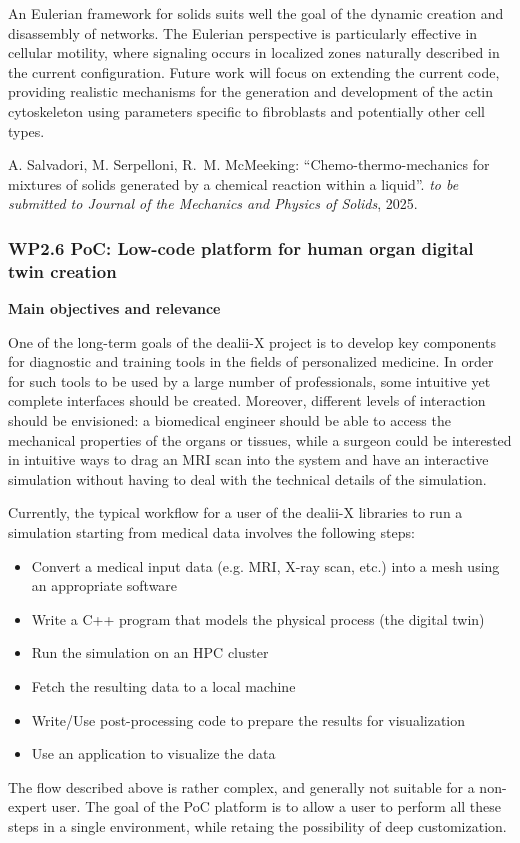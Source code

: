 \documentclass[a4paper,12pt, numbers]{article}
\begin{document}
An Eulerian framework for solids suits well the goal of the dynamic creation and disassembly of networks. The Eulerian perspective is particularly effective in cellular motility, where signaling occurs in localized zones naturally described in the current configuration. Future work will focus on extending the current code, providing realistic mechanisms for the generation and development of the actin cytoskeleton using parameters specific to fibroblasts and potentially other cell types.


\begin{thebibliography}{10}
 A. Salvadori, M. Serpelloni, R.~M. McMeeking: ``Chemo-thermo-mechanics for mixtures of solids generated by a chemical reaction within a liquid''. \emph{to be submitted to Journal of the Mechanics and Physics of
Solids}, 2025.
\end{thebibliography}

\subsubsection*{WP2.6 PoC: Low-code platform for human organ digital twin creation}

\noindent\textbf{Main objectives and relevance}

One of the long-term goals of the dealii-X project is to develop key components for diagnostic and training tools in the fields of personalized medicine. In order for such tools to be used by a large number of professionals, some intuitive yet complete interfaces should be created. Moreover, different levels of interaction should be envisioned: a biomedical engineer should be able to access the mechanical properties of the organs or tissues, while a surgeon could be interested in intuitive ways to drag an MRI scan into the system and have an interactive simulation without having to deal with the technical details of the simulation.

Currently, the typical workflow for a user of the dealii-X libraries to run a simulation starting from medical data involves the following steps:
\begin{itemize}
\item Convert a medical input data (e.g. MRI, X-ray scan, etc.) into a mesh using an appropriate software  
\item Write a C++ program that models the physical process (the digital twin)
\item Run the simulation on an HPC cluster
\item Fetch the resulting data to a local machine
\item Write/Use post-processing code to prepare the results for visualization
\item Use an application to visualize the data
\end{itemize} 
The flow described above is rather complex, and generally not suitable for a non-expert user. The goal of the PoC platform is to allow a user to perform all these steps in a single environment, while retaing the possibility of deep customization.
\end{document}

